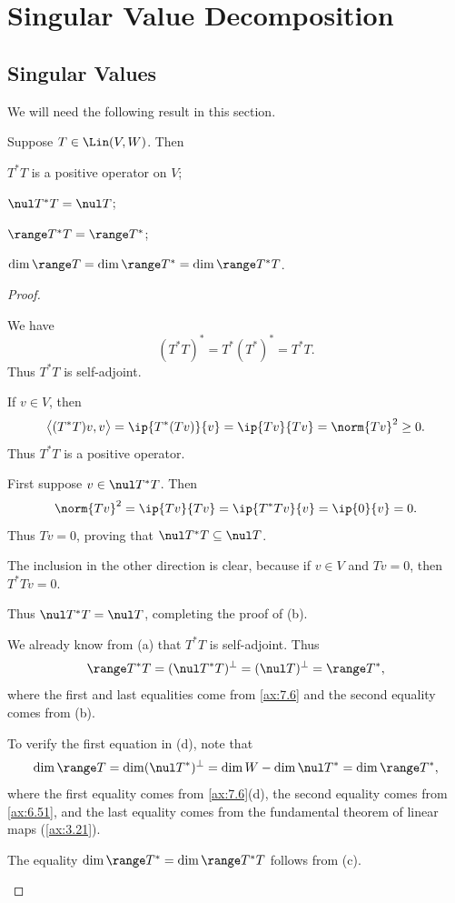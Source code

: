 \iftestbuild %
\setcounter{section}{4}\setcounter{theorem}{63}
\fi %
\DeclareRobustCommand\axeqno{\refstepcounter{theorem}\tag*{\thetheorem}}
\section{Singular Value Decomposition}

\subsection{Singular Values}

We will need the following result in this section.

\begin{result}[Properties of $T^*T$]\label{ax:7.64}
Suppose $T\in\Lin(V,W)$. Then
\begin{parts}
\item $T^*T$ is a positive operator on $V$;
\item $\nul T^*T=\nul T$;
\item $\range T^*T=\range T^*$;
\item $\dim\range T=\dim\range T^*=\dim\range T^*T$.
\end{parts}
\end{result}

\begin{proof}\leavevmode
\begin{parts}
\item We have
  \[ (T^*T)^* = T^*(T^*)^* = T^*T. \]
  Thus $T^*T$ is self-adjoint.

  If $v\in V$, then
  \[ \bigl\langle (T^*T)v, v\bigr\rangle = \ip{T^*(Tv)}{v} = \ip{Tv}{Tv}
     = \norm{Tv}^2 \ge 0. \]
  Thus $T^*T$ is a positive operator.
\item First suppose $v\in\nul T^*T$. Then
  \[ \norm{Tv}^2 = \ip{Tv}{Tv} = \ip{T^*Tv}{v} = \ip{0}{v} = 0. \]
  Thus $Tv=0$, proving that $\nul T^*T\subseteq\nul T$.

  The inclusion in the other direction is clear, because if $v\in V$ and
  $Tv=0$, then $T^*Tv=0$.

  Thus $\nul T^*T=\nul T$, completing the proof of (b).
\item We already know from (a) that $T^*T$ is self-adjoint. Thus
  \[ \range T^*T = (\nul T^*T)^\perp = (\nul T)^\perp = \range T^*, \]
  where the first and last equalities come from \ref{ax:7.6} and the second
  equality comes from (b).
\item To verify the first equation in (d), note that
  \[ \dim\range T = \dim(\nul T^*)^\perp = \dim W-\dim\nul T^* = \dim\range T^*, \]
  where the first equality comes from \ref{ax:7.6}(d), the second equality
  comes from \ref{ax:6.51}, and the last equality comes from the fundamental
  theorem of linear maps (\ref{ax:3.21}).

  The equality $\dim\range T^*=\dim\range T^*T$ follows from (c).\qedhere
\end{parts}
\end{proof}

